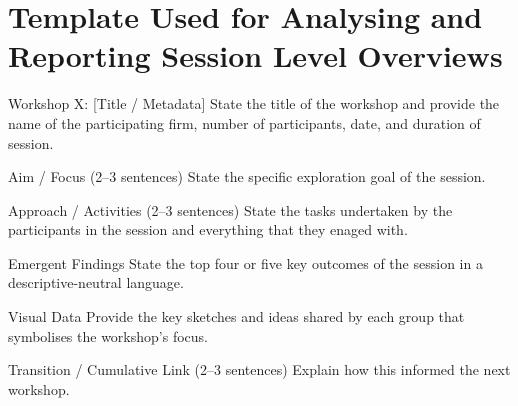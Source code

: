\section{Template Used for Analysing and Reporting Session Level Overviews}
\label{apx-sec-session-template}
Workshop X: [Title / Metadata]
State the title of the workshop and provide the name of the participating firm, number of participants, date, and duration of session.  

Aim / Focus (2–3 sentences)
State the specific exploration goal of the session.

Approach / Activities (2–3 sentences)
State the tasks undertaken by the participants in the session and everything that they enaged with.

Emergent Findings 
State the top four or five key outcomes of the session in a descriptive-neutral language.

Visual Data
Provide the key sketches and ideas shared by each group that symbolises the workshop’s focus.

Transition / Cumulative Link (2–3 sentences)
Explain how this informed the next workshop.